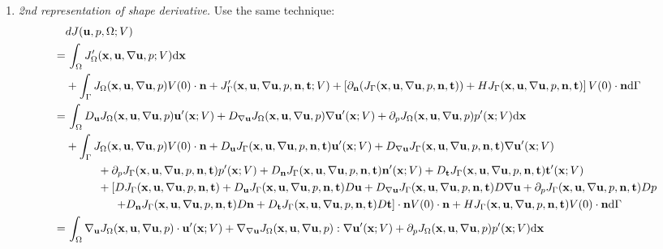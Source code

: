 \documentclass[oneside,11pt]{book}
\numberwithin{equation}{section}
\begin{document}
\begin{enumerate}[leftmargin=0in]
    \item \textit{2nd representation of shape derivative.} Use the same technique:
    \begin{align*}
        &dJ({\bf u},p,\Omega;V)\\
        =&\, \int_\Omega J_\Omega'({\bf x},{\bf u},\nabla{\bf u},p;V){\rm d}{\bf x}\\
        &+ \int_\Gamma J_\Omega({\bf x},{\bf u},\nabla{\bf u},p)V(0)\cdot{\bf n} + J_\Gamma'({\bf x},{\bf u},\nabla{\bf u},p,{\bf n},{\bf t};V) + \left[\partial_{\bf n}(J_\Gamma({\bf x},{\bf u},\nabla{\bf u},p,{\bf n},{\bf t})) + HJ_\Gamma({\bf x},{\bf u},\nabla{\bf u},p,{\bf n},{\bf t})\right]V(0)\cdot{\bf n}{\rm d}\Gamma\\
        =&\, \int_\Omega D_{\bf u}J_\Omega({\bf x},{\bf u},\nabla{\bf u},p){\bf u}'({\bf x};V) + D_{\nabla{\bf u}}J_\Omega({\bf x},{\bf u},\nabla{\bf u},p)\nabla{\bf u}'({\bf x};V) + \partial_pJ_\Omega({\bf x},{\bf u},\nabla{\bf u},p)p'({\bf x};V){\rm d}{\bf x}\\
        &+ \int_\Gamma J_\Omega({\bf x},{\bf u},\nabla{\bf u},p)V(0)\cdot{\bf n} + D_{\bf u}J_\Gamma({\bf x},{\bf u},\nabla{\bf u},p,{\bf n},{\bf t}){\bf u}'({\bf x};V) + D_{\nabla{\bf u}}J_\Gamma({\bf x},{\bf u},\nabla{\bf u},p,{\bf n},{\bf t})\nabla{\bf u}'({\bf x};V)\\
        &\hspace{1cm}+ \partial_pJ_\Gamma({\bf x},{\bf u},\nabla{\bf u},p,{\bf n},{\bf t})p'({\bf x};V) + D_{\bf n}J_\Gamma({\bf x},{\bf u},\nabla{\bf u},p,{\bf n},{\bf t}){\bf n}'({\bf x};V) + D_{\bf t}J_\Gamma({\bf x},{\bf u},\nabla{\bf u},p,{\bf n},{\bf t}){\bf t}'({\bf x};V)\\
        &\hspace{1cm}+ \left[DJ_\Gamma({\bf x},{\bf u},\nabla{\bf u},p,{\bf n},{\bf t}) + D_{\bf u}J_\Gamma({\bf x},{\bf u},\nabla{\bf u},p,{\bf n},{\bf t})D{\bf u} + D_{\nabla{\bf u}}J_\Gamma({\bf x},{\bf u},\nabla{\bf u},p,{\bf n},{\bf t})D\nabla{\bf u} + \partial_pJ_\Gamma({\bf x},{\bf u},\nabla{\bf u},p,{\bf n},{\bf t})Dp\right.\\
        &\hspace{15mm} \left.+ D_{\bf n}J_\Gamma({\bf x},{\bf u},\nabla{\bf u},p,{\bf n},{\bf t})D{\bf n} + D_{\bf t}J_\Gamma({\bf x},{\bf u},\nabla{\bf u},p,{\bf n},{\bf t})D{\bf t}\right]\cdot{\bf n}V(0)\cdot{\bf n} + HJ_\Gamma({\bf x},{\bf u},\nabla{\bf u},p,{\bf n},{\bf t})V(0)\cdot{\bf n}{\rm d}\Gamma\\
        =&\, \int_\Omega \nabla_{\bf u}J_\Omega({\bf x},{\bf u},\nabla{\bf u},p)\cdot{\bf u}'({\bf x};V) + \nabla_{\nabla{\bf u}}J_\Omega({\bf x},{\bf u},\nabla{\bf u},p):\nabla{\bf u}'({\bf x};V) + \partial_pJ_\Omega({\bf x},{\bf u},\nabla{\bf u},p)p'({\bf x};V){\rm d}{\bf x}\\

\end{align*}
\end{enumerate}
\end{document}
